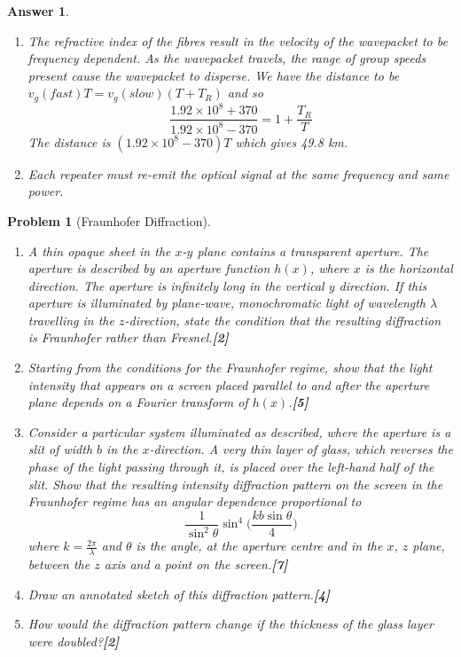 \documentclass[a4paper]{article}
\newtheorem{ans}{Answer}[subsection]
\theoremstyle{new}
\newtheorem{qns}{Problem}[subsection]
\begin{document}
\begin{ans}
\begin{enumerate}[label=(\roman*)]
$$\Delta u_g=\frac{\partial u_g}{\partial f}\Delta f=-\frac{2\tau c}{(1.5+\tau(2f_0-f_0))^2}\Delta f\implies|\Delta u_g|=\frac{2(3\times10^{-16})(3\times10^8)10^{10}}{(1.5+3\times10^{-16}2\times10^{14})^2}=740m/s$$
So the group velocity is $(1.92\times10^8\pm 370)$ m/s.
\item The refractive index of the fibres result in the velocity of the wavepacket to be frequency dependent. As the wavepacket travels, the range of group speeds present cause the wavepacket to disperse. We have the distance to be $v_g(fast)T=v_g(slow)(T+T_R)$ and so
$$\frac{1.92\times10^8+370}{1.92\times10^8-370}=1+\frac{T_R}{T}$$
The distance is $(1.92\times10^8-370)T$ which gives 49.8 km.
\item Each repeater must re-emit the optical signal at the same frequency and same power.
\end{enumerate}
\end{ans}
\begin{qns}[Fraunhofer Diffraction]\leavevmode
\begin{enumerate}[label=(\roman*)]
\item A thin opaque sheet in the $x$-$y$ plane contains a transparent aperture. The aperture is described by an aperture function $h(x)$, where $x$ is the horizontal direction. The aperture is infinitely long in the vertical $y$ direction. If this aperture is illuminated by plane-wave, monochromatic light of wavelength $\lambda$ travelling in the $z$-direction, state the condition that the resulting diffraction is Fraunhofer rather than Fresnel.\hfill\textbf{[2]}
\item Starting from the conditions for the Fraunhofer regime, show that the light intensity that appears on a screen placed parallel to and after the aperture plane depends on a Fourier transform of $h(x)$.\hfill\textbf{[5]}
\item Consider a particular system illuminated as described, where the aperture is a slit of width $b$ in the $x$-direction. A very thin layer of glass, which reverses the phase of the light passing through it, is placed over the left-hand half of the slit. Show that the resulting intensity diffraction pattern on the screen in the Fraunhofer regime has an angular dependence proportional to
$$\frac{1}{\sin^2\theta}\sin^4\bigg(\frac{kb\sin\theta}{4}\bigg)$$
where $k=\frac{2\pi}{\lambda}$ and $\theta$ is the angle, at the aperture centre and in the $x$, $z$ plane, between the $z$ axis and a point on the screen.\hfill\textbf{[7]}
\item Draw an annotated sketch of this diffraction pattern.\hfill\textbf{[4]}
\item How would the diffraction pattern change if the thickness of the glass layer were doubled?\hfill\textbf{[2]}
\end{enumerate}
\end{qns}
\end{document}
